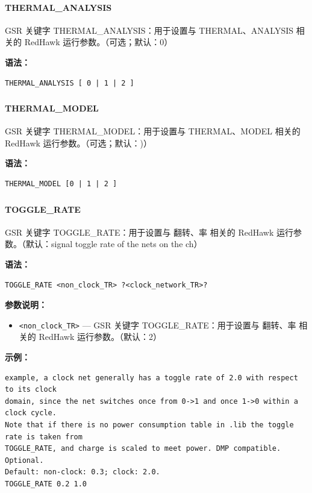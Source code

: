 \paragraph*{THERMAL_ANALYSIS}

GSR 关键字 THERMAL_ANALYSIS：用于设置与 THERMAL、ANALYSIS 相关的 RedHawk 运行参数。（可选；默认：0）

\textbf{语法：}
\begin{lstlisting}
THERMAL_ANALYSIS [ 0 | 1 | 2 ]
\end{lstlisting}

\subsubsection{}
\paragraph*{THERMAL_MODEL}

GSR 关键字 THERMAL_MODEL：用于设置与 THERMAL、MODEL 相关的 RedHawk 运行参数。（可选；默认：)）

\textbf{语法：}
\begin{lstlisting}
THERMAL_MODEL [0 | 1 | 2 ]
\end{lstlisting}

\subsubsection{}
\paragraph*{TOGGLE_RATE}

GSR 关键字 TOGGLE_RATE：用于设置与 翻转、率 相关的 RedHawk 运行参数。（默认：signal toggle rate of the nets on the ch）

\textbf{语法：}
\begin{lstlisting}
TOGGLE_RATE <non_clock_TR> ?<clock_network_TR>?
\end{lstlisting}

\textbf{参数说明：}
\begin{itemize}
\item \texttt{<non\_clock\_TR>} — GSR 关键字 TOGGLE\_RATE：用于设置与 翻转、率 相关的 RedHawk 运行参数。（默认：2）
\end{itemize}

\textbf{示例：}
\begin{lstlisting}
example, a clock net generally has a toggle rate of 2.0 with respect to its clock
domain, since the net switches once from 0->1 and once 1->0 within a clock cycle.
Note that if there is no power consumption table in .lib the toggle rate is taken from
TOGGLE_RATE, and charge is scaled to meet power. DMP compatible. Optional.
Default: non-clock: 0.3; clock: 2.0.
TOGGLE_RATE 0.2 1.0
\end{lstlisting}

